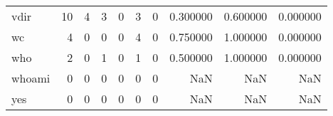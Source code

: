 \begin{tabular}{lrrrrrrrrr}
vdir      &                                                 10 &                                                  4 &                                                  3 &                                                  0 &                                                  3 &                                                  0 &                                           0.300000 &                               0.600000 &                             0.000000 \\
wc        &                                                  4 &                                                  0 &                                                  0 &                                                  0 &                                                  4 &                                                  0 &                                           0.750000 &                               1.000000 &                             0.000000 \\
who       &                                                  2 &                                                  0 &                                                  1 &                                                  0 &                                                  1 &                                                  0 &                                           0.500000 &                               1.000000 &                             0.000000 \\
whoami    &                                                  0 &                                                  0 &                                                  0 &                                                  0 &                                                  0 &                                                  0 &                                                NaN &                                    NaN &                                  NaN \\
yes       &                                                  0 &                                                  0 &                                                  0 &                                                  0 &                                                  0 &                                                  0 &                                                NaN &                                    NaN &                                  NaN \\
\bottomrule
\end{tabular}
